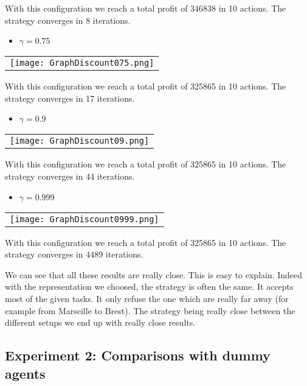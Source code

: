 \documentclass[11pt]{article}
\begin{document}
With this configuration we reach a total profit of 346838 in 10 actions. The strategy converges in 8 iterations.

\begin{itemize}
\item $\gamma = 0.75$
\end{itemize}
\begin{tabular}{|c|}
\texttt{[image: GraphDiscount075.png]}
\end{tabular}

With this configuration we reach a total profit of 325865 in 10 actions. The strategy converges in 17 iterations.

\begin{itemize}
\item $\gamma = 0.9$
\end{itemize}
\begin{tabular}{|c|}
\texttt{[image: GraphDiscount09.png]}
\end{tabular}

With this configuration we reach a total profit of 325865 in 10 actions. The strategy converges in 44 iterations.

\begin{itemize}
\item $\gamma = 0.999$
\end{itemize}
\begin{tabular}{|c|}
\texttt{[image: GraphDiscount0999.png]}
\end{tabular}

With this configuration we reach a total profit of 325865 in 10 actions. The strategy converges in 4489 iterations.

We can see that all these results are really close. This is easy to explain. Indeed with the representation we choosed, the strategy is often the same. It accepts most of the given tasks. It only refuse the one which are really far away (for example from Marseille to Brest). The strategy being really close between the different setups we end up with really close results.

\subsection{Experiment 2: Comparisons with dummy agents}
\end{document}
